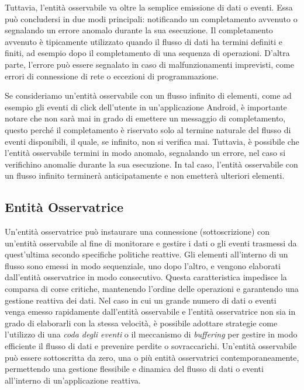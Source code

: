\documentclass[12pt,a4paper,openright,twoside]{book}
\begin{document}
Tuttavia, l'entità osservabile va oltre la semplice emissione di dati o eventi. Essa può concludersi in due modi principali: notificando un completamento avvenuto o segnalando un errore anomalo durante la sua esecuzione. Il completamento avvenuto è tipicamente utilizzato quando il flusso di dati ha termini definiti e finiti, ad esempio dopo il completamento di una sequenza di operazioni. D'altra parte, l'errore può essere segnalato in caso di malfunzionamenti imprevisti, come errori di connessione di rete o eccezioni di programmazione.

Se consideriamo un'entità osservabile con un flusso infinito di elementi, come ad esempio gli eventi di click dell'utente in un'applicazione Android, è importante notare che non sarà mai in grado di emettere un messaggio di completamento, questo perché il completamento è riservato solo al termine naturale del flusso di eventi disponibili, il quale, se infinito, non si verifica mai. Tuttavia, è possibile che l'entità osservabile termini in modo anomalo, segnalando un errore, nel caso si verifichino anomalie durante la sua esecuzione. In tal caso, l'entità osservabile con un flusso infinito terminerà anticipatamente e non emetterà ulteriori elementi.

\subsection{Entità Osservatrice}
Un'entità osservatrice può instaurare una connessione (sottoscrizione) con un'entità osservabile al fine di monitorare e gestire i dati o gli eventi trasmessi da quest'ultima secondo specifiche politiche reattive. 
Gli elementi all'interno di un flusso sono emessi in modo sequenziale, uno dopo l'altro, e vengono elaborati dall'entità osservatrice in modo consecutivo. Questa caratteristica impedisce la comparsa di corse critiche, mantenendo l'ordine delle operazioni e garantendo una gestione reattiva dei dati.
Nel caso in cui un grande numero di dati o eventi venga emesso rapidamente dall'entità osservabile e l'entità osservatrice non sia in grado di elaborarli con la stessa velocità, è possibile adottare strategie come l'utilizzo di una \textit{coda degli eventi} o il meccanismo di \textit{buffering} per gestire in modo efficiente il flusso di dati e prevenire perdite o sovraccarichi.
Un'entità osservabile può essere sottoscritta da zero, una o più entità osservatrici contemporaneamente, permettendo una gestione flessibile e dinamica del flusso di dati o eventi all'interno di un'applicazione reattiva. 
\end{document}
